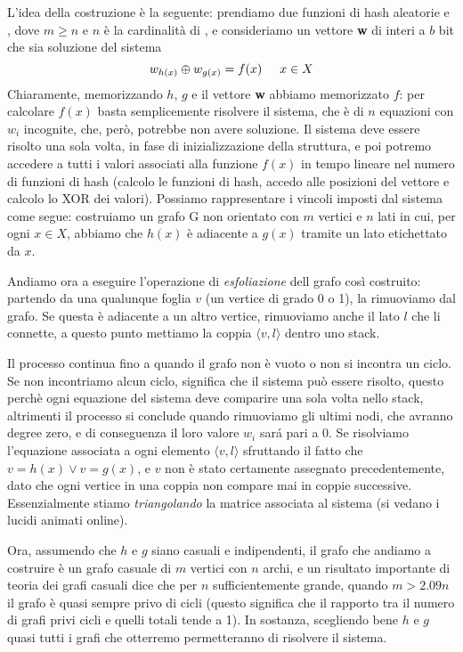 L'idea della costruzione è la seguente: prendiamo due funzioni di hash aleatorie  e , dove $m \geq n$ e $n$ è la cardinalità di , e consideriamo un vettore \textbf{w} di interi a $b$ bit che sia soluzione del sistema
\begin{equation*}
    w_{h(x)} \oplus w_{g(x)} = f(x) \hspace{5mm} x \in X
\end{equation*}
Chiaramente, memorizzando $h$, $g$ e il vettore \textbf{w} abbiamo memorizzato $f$: per calcolare $f(x)$ basta semplicemente risolvere il sistema, che è di $n$ equazioni con $w_i$ incognite, che, però, potrebbe non avere soluzione. Il sistema deve essere risolto una sola volta, in fase di inizializzazione della struttura, e poi potremo accedere a tutti i valori associati alla funzione $f(x)$ in tempo lineare nel numero di funzioni di hash (calcolo le funzioni di hash, accedo alle posizioni del vettore e calcolo lo XOR dei valori). Possiamo rappresentare i vincoli imposti dal sistema come segue: costruiamo un grafo G non orientato con $m$ vertici e $n$ lati in cui, per ogni $x \in X$, abbiamo che $h(x)$ è adiacente a $g(x)$ tramite un lato etichettato da $x$.

Andiamo ora a eseguire l'operazione di \textit{esfoliazione} dell grafo così costruito: partendo da una qualunque foglia $v$ (un vertice di grado 0 o 1), la rimuoviamo dal grafo. Se questa è adiacente a un altro vertice, rimuoviamo anche il lato $l$ che li connette, a questo punto mettiamo la coppia $\langle v, l \rangle$ dentro uno stack.

Il processo continua fino a quando il grafo non è vuoto o non si incontra un ciclo. Se non incontriamo alcun ciclo, significa che il sistema può essere risolto, questo perchè ogni equazione del sistema deve comparire una sola volta nello stack, altrimenti il processo si conclude quando rimuoviamo gli ultimi nodi, che avranno degree zero, e di conseguenza il loro valore $w_i$ sará pari a 0. Se risolviamo l'equazione associata a ogni elemento $\langle v, l \rangle$ sfruttando il fatto che $v = h(x) \lor v = g(x)$, e $v$ non è stato certamente assegnato precedentemente, dato che ogni vertice in una coppia non compare mai in coppie successive. Essenzialmente stiamo \textit{triangolando} la matrice associata al sistema (si vedano i lucidi animati online).

Ora, assumendo che $h$ e $g$ siano casuali e indipendenti, il grafo che andiamo a costruire è un grafo casuale di $m$ vertici con $n$ archi, e un risultato importante di teoria dei grafi casuali dice che per $n$ sufficientemente grande, quando $m > 2.09n$ il grafo è quasi sempre privo di cicli (questo significa che il rapporto tra il numero di grafi privi cicli e quelli totali tende a 1). In sostanza, scegliendo bene $h$ e $g$ quasi tutti i grafi che otterremo permetteranno di risolvere il sistema.

